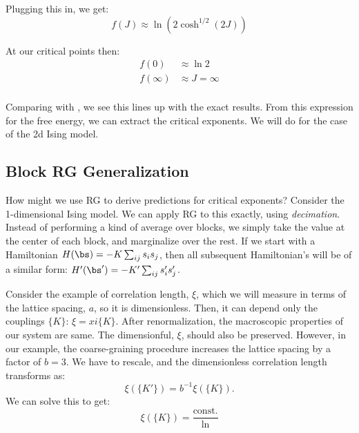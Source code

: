 Plugging this in, we get:
\begin{equation}%
  f(J)\approx \ln \left( 2 \cosh^{1/2}(2J)\right)
\end{equation}%

At our critical points then:
\begin{align}%
  f(0)&\approx \ln 2\\
  f(\infty)&\approx J=\infty\\
  \label{eq:ising-1d-rg-free-energy}
\end{align}%

Comparing with , we see
this lines up with the exact results. From this expression for the
free energy, we can extract the critical
exponents\label{sec:decimation-free-energy}. We will do for the case
of the 2d Ising model.
%
\subsection{Block RG Generalization}\label{sec:block-rg-generalization}




How might we use RG to derive predictions for critical exponents?
Consider the 1-dimensional Ising model. We can apply RG to this exactly, using
\textit{decimation}. Instead of performing a kind of average over blocks,
we simply take the value at the center of each block, and marginalize over the rest.
If we start with a Hamiltonian $H(\bs)=-K\sum_{ij}s_is_j$, then all subsequent
Hamiltonian's will be of a similar form: $H'(\bs')=-K'\sum_{ij}s_i' s_j'$.

Consider the example of correlation length, $\xi$, which we will
measure in terms of the lattice spacing, $a$, so it is
dimensionless. Then, it can depend only the couplings $\{K\}$: $\xi=xi\{K\}$.
After renormalization, the macroscopic properties of our system are same. The
dimensionful, $\xi$, should also be preserved. However, in our example, the coarse-graining
procedure increases the lattice spacing by a factor of $b=3$. We have to rescale,
and the dimensionless correlation length transforms as:
\begin{equation}%
\xi(\{K'\})=b^{-1}\xi(\{K\}).
\end{equation}%
We can solve this to get:
\begin{equation}%
\xi(\{K\})=\frac{\text{const.}}{\ln }
\end{equation}%






